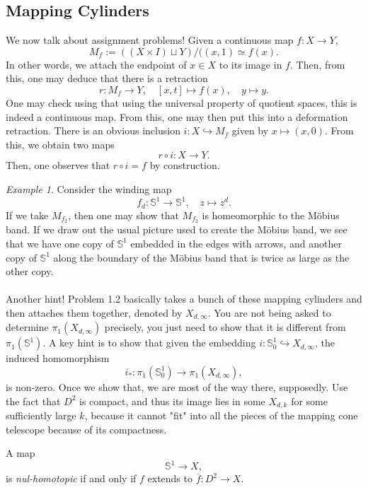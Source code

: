 \documentclass[a4paper]{report}
\theoremstyle{definition}
\theoremstyle{remark}
\theoremstyle{proposition}
\theoremstyle{conjecture}
\theoremstyle{lemma}
\theoremstyle{corollary}
\theoremstyle{exercise}
\newtheorem{example}{Example}
\begin{document}
\subsection{Mapping Cylinders}

We now talk about assignment problems! Given a continuous map $f : X \to Y$,
$$M_f := ((X\times I) \sqcup Y)/((x,1) \simeq f(x).$$
In other words, we attach the endpoint of $x\in X$ to its image in $f$.
Then, from this, one may deduce that there is a retraction
$$r : M_f \longrightarrow Y, \quad [x,t] \longmapsto f(x),\quad y\longmapsto y.$$
One may check using that using the universal property of quotient spaces,
this is indeed a continuous map. From this, one may then put this into a 
deformation retraction.
There is an obvious inclusion $i : X \hookrightarrow M_f$ given by 
$x\mapsto (x,0)$. From this, we obtain two maps 
$$r \circ i : X \longrightarrow Y.$$ 
Then, one observes that $r \circ i = f$ by construction.

\begin{example}
    Consider the winding map 
    $$f_d : \mathbb{S}^1 \longrightarrow \mathbb{S}^1,\quad z\longmapsto z^d.$$
    If we take $M_{f_2}$, then one may show that $M_{f_2}$ is homeomorphic 
    to the M\"obius band. If we draw out the usual picture used to create the 
    M\"obius band, we see that we have one copy of $\mathbb{S}^1$ embedded 
    in the edges with arrows, and another copy of $\mathbb{S}^1$ along the 
    boundary of the M\"obius band that is twice as large as the other copy.\\\\
    Another hint! Problem 1.2 basically takes a bunch of these mapping cylinders 
    and then attaches them together, denoted by $X_{d,\infty}$.
    You are not being asked to determine $\pi_1(X_{d,\infty})$ precisely,
    you just need to show that it is different from $\pi_1(\mathbb{S}^1)$.
    A key hint is to show that given the embedding $i : \mathbb{S}^1_0 \hookrightarrow X_{d,\infty}$,
    the induced homomorphism 
    $$i_\ast : \pi_1(\mathbb{S}^1_0) \longrightarrow \pi_1(X_{d,\infty}),$$
    is non-zero. Once we show that, we are most of the way there, supposedly.
    Use the fact that $D^2$ is compact, and thus its image lies in some 
    $X_{d,k}$ for some sufficiently large $k$, because it cannot "fit" into all the 
    pieces of the mapping cone telescope because of its compactness.
\end{example}

A map $$\mathbb{S}^1 \longrightarrow X,$$ is \emph{nul-homotopic} if and only if 
$f$ extends to $\overline{f} : D^2 \to X$.
\end{document}

